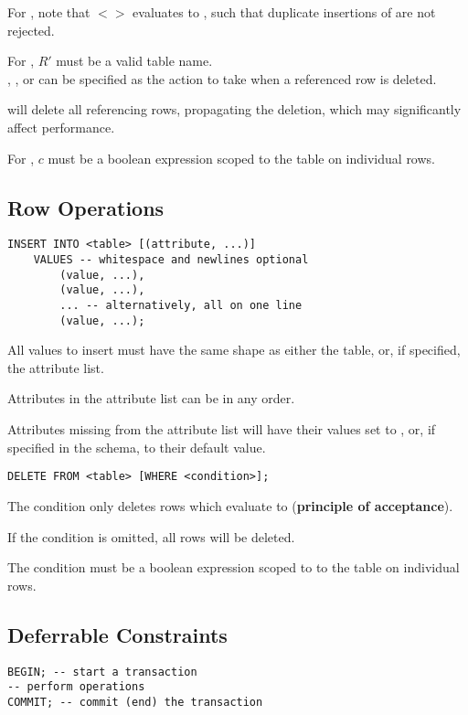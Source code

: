 For , note that  $<>$  evaluates to ,
such that duplicate insertions of  are not rejected.

For , $R'$ must be a valid table name. \\
, , or  can be specified as the action to take when a referenced row is deleted.

 will delete all referencing rows, propagating the deletion, which may significantly affect performance.

For , $c$ must be a boolean expression scoped to the table on individual rows.

\subsection{Row Operations}
\begin{lstlisting}
INSERT INTO <table> [(attribute, ...)]
    VALUES -- whitespace and newlines optional
        (value, ...),
        (value, ...),
        ... -- alternatively, all on one line
        (value, ...);
\end{lstlisting}

All values to insert must have the same shape as either the table, or, if specified, the attribute list.

Attributes in the attribute list can be in any order.

Attributes missing from the attribute list will have their values set to , or, if specified in the schema, to their default value.

\begin{lstlisting}
DELETE FROM <table> [WHERE <condition>];
\end{lstlisting}

The condition only deletes rows which evaluate to  (\textbf{principle of acceptance}).

If the condition is omitted, all rows will be deleted.

The condition must be a boolean expression scoped to to the table on individual rows.

\subsection{Deferrable Constraints}
\begin{lstlisting}
BEGIN; -- start a transaction
-- perform operations
COMMIT; -- commit (end) the transaction
\end{lstlisting}


